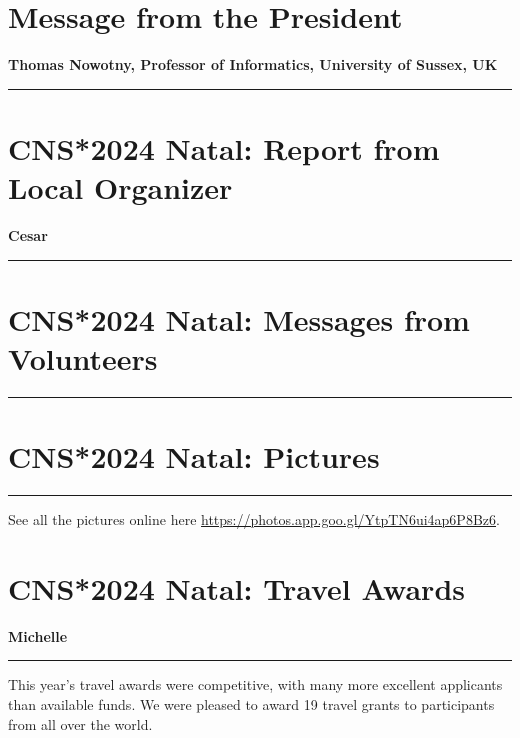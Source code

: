 \documentclass[11pt,a4paper,oneside]{article}
\begin{document}

\newpage

\pagestyle{fancy}
\fancyhead{}
\fancyfoot{}

\newpage
\section*{Message from the President}%
\textbf{\large Thomas Nowotny, Professor of Informatics, University of Sussex, UK\\}
\rule{\textwidth}{0.4pt}

\lipsum[1-3]

\newpage
\section*{CNS*2024 Natal: Report from Local Organizer}%
\textbf{\large Cesar\\}
\rule{\textwidth}{0.4pt}
\lipsum[1-3]

\newpage
\section*{CNS*2024 Natal: Messages from Volunteers}%
\rule{\textwidth}{0.4pt}
\lipsum[1-3]

\newpage
\section*{CNS*2024 Natal: Pictures}%
\rule{\textwidth}{0.4pt}
See all the pictures online here \url{https://photos.app.goo.gl/YtpTN6ui4ap6P8Bz6}.

\newpage
\section*{CNS*2024 Natal: Travel Awards}%
\textbf{\large Michelle\\}
\rule{\textwidth}{0.4pt}
This year's travel awards were competitive, with many more excellent applicants than available funds.
We were pleased to award 19 travel grants to participants from all over the world.

\newpage
\end{document}
